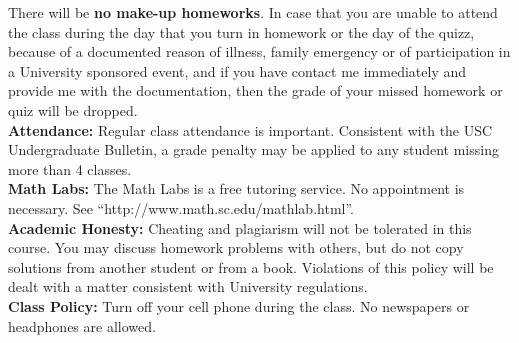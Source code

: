 \documentclass[11pt]{amsart}
\begin{document}
There will be  \textbf{no make-up homeworks}. In case that you are unable to attend the class
during the day that you turn in homework or the day of the quizz, because of a documented
reason of illness, family emergency or of participation in a University
sponsored event, and if you have contact me immediately and provide me with the
documentation, then the grade of your missed homework or quiz will be dropped.\\[0.3cm]
{\bf Attendance:} Regular class attendance is important. Consistent
with the USC Undergraduate Bulletin, a grade penalty may be applied to
any student missing more than 4 classes.\\[0.3cm]
{\bf Math Labs:} The Math Labs is a free tutoring service. 
No appointment is necessary. See ``http://www.math.sc.edu/mathlab.html''.\\[0.3cm]
{\bf Academic Honesty:} Cheating and plagiarism will not be tolerated
in this course. You may discuss homework problems with others, but do
not copy solutions from another student or from a book. Violations of
this policy will be dealt with a matter consistent with University
regulations.\\[0.3cm]
{\bf Class Policy:} Turn off your cell phone during the class. No newspapers or headphones are allowed.
\end{document}

